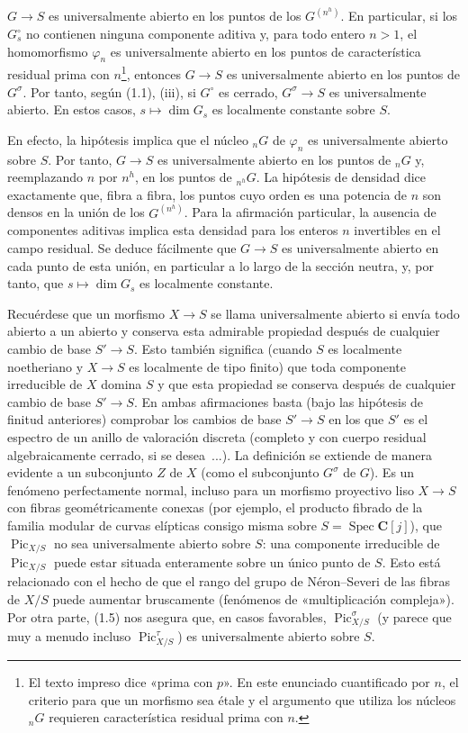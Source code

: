 $G\longrightarrow S$ es universalmente abierto en los puntos de los
$G^{(n^h)}$. En particular, si los $G_s^\circ$ no contienen ninguna componente
aditiva y, para todo entero $n>1$, el homomorfismo $\varphi_n$ es
universalmente abierto en los puntos de característica residual prima con
$n$\footnote{El texto impreso dice «prima con $p$». En este enunciado
cuantificado por $n$, el criterio para que un morfismo sea étale y el argumento que utiliza los
núcleos $ {}_nG$ requieren característica residual prima con $n$.}, entonces
$G\longrightarrow S$ es universalmente abierto en los puntos de $G^\sigma$.
Por tanto, según (1.1), (iii), si $G^\circ$ es cerrado,
$G^\sigma\longrightarrow S$ es universalmente abierto. En estos casos,
$s\longmapsto\dim G_s$ es localmente constante sobre $S$.

En efecto, la hipótesis implica que el núcleo $ {}_nG$ de $\varphi_n$ es
universalmente abierto sobre $S$. Por tanto, $G\longrightarrow S$ es
universalmente abierto en los puntos de $ {}_nG$ y, reemplazando $n$ por
$n^h$, en los puntos de $ {}_{n^h}G$. La hipótesis de densidad dice exactamente que, fibra a fibra, los puntos cuyo
orden es una potencia de $n$ son densos en la unión de los $G^{(n^h)}$. Para
la afirmación particular, la ausencia de componentes aditivas implica esta
densidad para los enteros $n$ invertibles en el campo residual. Se deduce fácilmente que
$G\longrightarrow S$ es universalmente abierto en cada punto de esta unión,
en particular a lo largo de la sección neutra, y, por tanto, que
$s\longmapsto\dim G_s$ es localmente constante.

 Recuérdese que un morfismo $X\longrightarrow S$ se
llama universalmente abierto si envía todo abierto a un abierto y conserva
esta admirable propiedad después de cualquier cambio de base
$S'\longrightarrow S$. Esto también significa (cuando $S$ es localmente
noetheriano y $X\longrightarrow S$ es localmente de tipo finito) que toda
componente irreducible de $X$ domina $S$ y que esta propiedad se conserva
después de cualquier cambio de base $S'\longrightarrow S$. En ambas
afirmaciones basta (bajo las hipótesis de finitud anteriores) comprobar los
cambios de base $S'\longrightarrow S$ en los que $S'$ es el espectro de un
anillo de valoración discreta (completo y con cuerpo residual algebraicamente
cerrado, si se desea~...). La definición se extiende de manera evidente a un
subconjunto $Z$ de $X$ (como el subconjunto $G^\sigma$ de $G$). Es un fenómeno
perfectamente normal, incluso para un morfismo proyectivo liso
$X\longrightarrow S$ con fibras geométricamente conexas (por ejemplo, el
producto fibrado de la familia modular de curvas elípticas consigo misma sobre
$S=\operatorname{Spec}\mathbf C[j]$), que $\operatorname{Pic}_{X/S}$ no sea
universalmente abierto sobre $S$: una componente irreducible de
$\operatorname{Pic}_{X/S}$ puede estar situada enteramente sobre un único
punto de $S$. Esto está relacionado con el hecho de que el rango del grupo de
Néron--Severi de las fibras de $X/S$ puede aumentar bruscamente (fenómenos de
«multiplicación compleja»). Por otra parte, (1.5) nos asegura que, en casos
favorables, $\operatorname{Pic}_{X/S}^\sigma$ (y parece que muy a menudo incluso
$\operatorname{Pic}_{X/S}^\tau$) es universalmente abierto sobre $S$.

